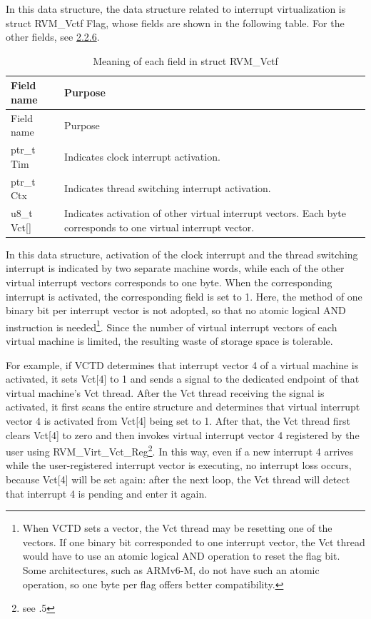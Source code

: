 In this data structure, the data structure related to interrupt virtualization is struct RVM\_Vctf Flag, whose fields are shown in the following table. For the other fields, see \protect\hyperref[subsec:2-2-6]{2.2.6}.

\begin{xltabular}{\textwidth}{@{}>{\hsize\raggedright\arraybackslash}X>{\hsize\raggedright\arraybackslash}X@{}}
\caption{Meaning of each field in struct RVM\_\allowbreak{}Vctf}\label{tab:2-4}\\
\toprule
Field name & Purpose\tabularnewline
\endfirsthead
\toprule
Field name & Purpose\tabularnewline
\midrule
\endhead
\bottomrule
\endlastfoot
ptr\_\allowbreak{}t Tim & Indicates clock interrupt activation.\tabularnewline
ptr\_\allowbreak{}t Ctx & Indicates thread switching interrupt activation.\tabularnewline
u8\_\allowbreak{}t Vct{[}{]} &
Indicates activation of other virtual interrupt vectors. Each byte corresponds to one virtual interrupt vector.\tabularnewline
\end{xltabular}

In this data structure, activation of the clock interrupt and the thread switching interrupt is indicated by two separate machine words, while each of the other virtual interrupt vectors corresponds to one byte. When the corresponding interrupt is activated, the corresponding field is set to 1. Here, the method of one binary bit per interrupt vector is not adopted, so that no atomic logical AND instruction is needed\footnote{When VCTD sets a vector, the Vct thread may be resetting one of the vectors. If one binary bit corresponded to one interrupt vector, the Vct thread would have to use an atomic logical AND operation to reset the flag bit. Some architectures, such as ARMv6-M, do not have such an atomic operation, so one byte per flag offers better compatibility.}. Since the number of virtual interrupt vectors of each virtual machine is limited, the resulting waste of storage space is tolerable.

For example, if VCTD determines that interrupt vector 4 of a virtual machine is activated, it sets Vct{[}4{]} to 1 and sends a signal to the dedicated endpoint of that virtual machine's Vct thread. After the Vct thread receiving the signal is activated, it first scans the entire structure and determines that virtual interrupt vector 4 is activated from Vct{[}4{]} being set to 1. After that, the Vct thread first clears Vct{[}4{]} to zero and then invokes virtual interrupt vector 4 registered by the user using RVM\_Virt\_Vct\_Reg\footnote{see .5}. In this way, even if a new interrupt 4 arrives while the user-registered interrupt vector is executing, no interrupt loss occurs, because Vct{[}4{]} will be set again: after the next loop, the Vct thread will detect that interrupt 4 is pending and enter it again.

